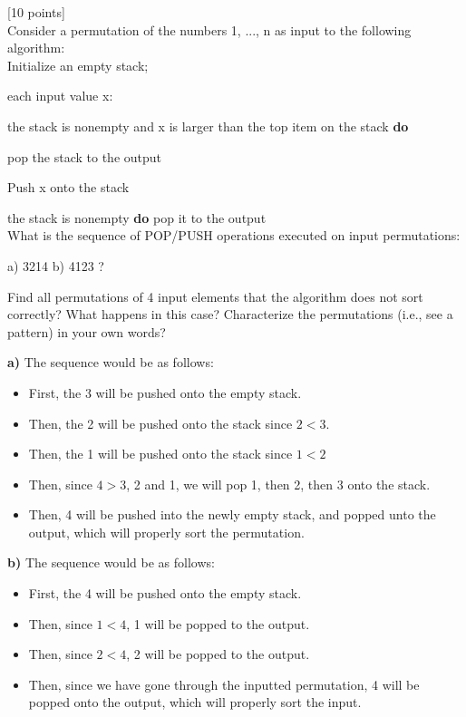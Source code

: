 \documentclass[12pt]{article}
\newcounter{ques}
\newenvironment{question}{\stepcounter{ques}{\noindent\bf Question \arabic{ques}:}}{\vspace{5mm}}
\begin{document}
\begin{question}[10 points]\\
Consider a permutation of the numbers 1, ..., n as input to the following algorithm:\\

\noindent Initialize an empty stack;

 each input value x:

 the stack is nonempty and x is larger than the top item on the stack {\bf do}

\indent \indent  pop the stack to the output

\indent	Push x onto the stack

 the stack is nonempty {\bf  do} pop it to the output\\


What  is the sequence of POP/PUSH operations executed on input permutations:

a) 3214   b) 4123  ?


Find all permutations  of 4 input elements that the algorithm does not sort correctly?
What happens in this case? Characterize the permutations (i.e., see a pattern) in your own words?

\textbf{a)}
The sequence would be as follows:
\begin{itemize}
  \item First, the 3 will be pushed onto the empty stack.
  \item Then, the 2 will be pushed onto the stack since $2<3$.
  \item Then, the 1 will be pushed onto the stack since $1<2$
  \item Then,  since $4> 3$, 2 and 1, we will pop 1, then 2, then 3 onto the stack.
  \item Then, 4 will be pushed into the newly empty stack, and popped unto the output, which will properly sort the permutation.
\end{itemize}

\textbf{b)}
The sequence would be as follows:
\begin{itemize}
  \item First, the 4 will be pushed onto the empty stack.
  \item Then, since $1<4$, 1 will be popped to the output.
  \item Then, since $2<4$, 2 will be popped to the output.
  \item Then, since we have gone through the inputted permutation, 4 will be popped onto the output, which will properly sort the input.
\end{itemize}


\end{question}
\end{document}
